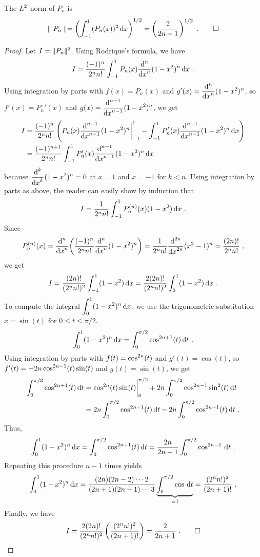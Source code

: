 \begin{prop}
The $\DS L^2$-norm of $P_n$ is
\[
\parallel P_n \parallel = \left( \int_{-1}^{1} (P_n(x))^2 \dx{x}
\right)^{1/2} = \left( \frac{2}{2n+1} \right)^{1/2} \ .  \qedhere
\]
\end{prop}

\begin{proof}
Let $\DS I = \| P_n\|^2$.  Using Rodrique's formula, we have
\[
I = \frac{(-1)^n}{2^n n!} \int_{-1}^1 P_n(x) \dfdxn{(1-x^2)^n}{x}{n} \dx{x} \ .
\]
Using integration by parts with $f(x) = P_n(x)$ and
$\DS g'(x) = \dfdxn{(1-x^2)^n}{x}{n}$, so
$f'(x) = P_n'(x)$ and
$\DS g(x) = \dfdxn{(1-x^2)^n}{x}{n-1}$, we get
\begin{align*}
I &= \frac{(-1)^n}{2^n n!} \left( P_n(x) \dfdxn{(1-x^2)^n}{x}{n-1}\bigg|_{-1}^1 
- \int_{-1}^1 P_n'(x) \dfdxn{(1-x^2)^n}{x}{n-1} \dx{x} \right) \\
&= \frac{(-1)^{n+1}}{2^n n!}
 \int_{-1}^1 P_n'(x) \dfdxn{(1-x^2)^n}{x}{n-1} \dx{x}
\end{align*}
because $\DS \dfdxn{(1-x^2)^n}{x}{k} = 0$ at $x=1$ and
$x=-1$ for $k<n$.  Using integration by parts as above, the reader
can easily show by induction that
\[
I = \frac{1}{2^n n!} \int_{-1}^1 P_n^{(n)}(x) (1-x^2) \dx{x} \ .
\]
Since
\[
P_n^{(n)}(x) = \dfdxn{
\left( \frac{(-1)^n}{2^n n!} \dfdxn{(1-x^2)^n}{x}{n}\right)}{x}{n}
= \frac{1}{2^n n!} \dfdxn{(x^2-1)^n}{x}{2n} = \frac{(2n)!}{2^n n!} \ ,
\]
we get
\[
I = \frac{(2n)!}{(2^n n!)^2} \int_{-1}^1 (1-x^2) \dx{x}
= \frac{2(2n)!}{(2^n n!)^2} \int_0^1 (1-x^2) \dx{x} \ .
\]
To compute the integral $\DS \int_0^1 (1-x^2)^n \dx{x}$, we
use the trigonometric substitution $x=\sin(t)$ for
$0 \leq t \leq \pi/2$.
\[
\int_0^1 (1-x^2)^n \dx{x} = \int_0^{\pi/2} \cos^{2n+1}(t) \dx{t} \ .
\]
Using integration by parts with $\DS f(t) = \cos^{2n}(t)$ and
$g'(t) = \cos(t)$, so\\
$\DS f'(t) = -2n \cos^{2n-1}(t)\sin(t)$ and
$g(t) = \sin(t)$, we get
\begin{align*}
\int_0^{\pi/2} \cos^{2n+1}(t) \dx{t} &= \cos^{2n}(t)\sin(t)\bigg|_0^{\pi/2}
+ 2n \int_0^{\pi/2} \cos^{2n-1}\sin^2(t)\dx{t} \\
&= 2n \int_0^{\pi/2} \cos^{2n-1}(t) \dx{t} - 2n \int_0^{\pi/2}
\cos^{2n+1}(t) \dx{t} \ .
\end{align*}
Thus,
\[
\int_0^1 (1-x^2)^n \dx{x} = \int_0^{\pi/2} \cos^{2n+1}(t) \dx{t}
= \frac{2n}{2n+1} \int_0^{\pi/2} \cos^{2n-1}\dx{t} \ .
\]
Repeating this procedure $n-1$ times yields
\[
\int_0^1 (1-x^2)^n \dx{x}
= \frac{(2n)(2n-2)\cdots 2}{(2n+1)(2n-1)\cdots 3}
\underbrace{\int_0^{\pi/2} \cos\dx{t}}_{=1} = \frac{(2^n n!)^2}{(2n+1)!} \ .
\]
Finally, we have
\[
I = \frac{2(2n)!}{(2^n n!)^2} \left( \frac{(2^n n!)^2}{(2n+1)!} \right)
= \frac{2}{2n+1} \ .    \qedhere
\]
\end{proof}

